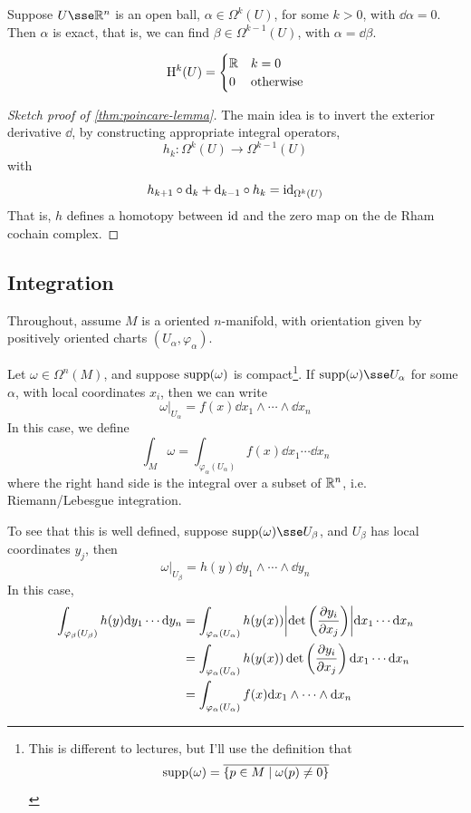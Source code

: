 \documentclass{article}
\begin{document}
\begin{theorem}
    \label{thm:poincare-lemma}
    Suppose \(U \sse \R^n\) is an open ball, \(\alpha \in \Omega^k(U)\), for some \(k > 0\), with \(\dd\alpha = 0\). Then \(\alpha\) is exact, that is, we can find \(\beta \in \Omega^{k-1}(U)\), with \(\alpha = \dd\beta\).
\end{theorem}

\begin{corollary}
    \[\mathrm{H}^k(U) = \begin{cases}
        \mathbb{R} & k = 0 \\
        0 & \text{otherwise}
    \end{cases}\]
\end{corollary}

\begin{proof}
    [Sketch proof of \cref{thm:poincare-lemma}] The main idea is to invert the exterior derivative \(\dd\), by constructing appropriate integral operators,
    \[h_k : \Omega^k(U) \to \Omega^{k-1}(U)\]
    with
    \[h_{k+1} \circ \dd_k + \dd_{k-1} \circ h_k = \operatorname{id}_{\Omega^k(U)}\]
    That is, \(h\) defines a homotopy between \(\operatorname{id}\) and the zero map on the de Rham cochain complex.
\end{proof}

\subsection{Integration}

Throughout, assume \(M\) is a oriented \(n\)-manifold, with orientation given by positively oriented charts \((U_\alpha, \varphi_\alpha)\).

Let \(\omega \in \Omega^n(M)\), and suppose \(\operatorname{supp}(\omega)\) is compact\footnote{This is different to lectures, but I'll use the definition that
\[\operatorname{supp}(\omega) = \overline{\{p \in M \mid \omega(p) \ne 0\}}\]}. If \(\Supp(\omega) \sse U_\alpha\) for some \(\alpha\), with local coordinates \(x_i\), then we can write
\[\omega\vert_{U_\alpha} = f(x)\dd x_1 \wedge \cdots \wedge \dd x_n\]
In this case, we define
\[\int_M \omega = \int_{\varphi_\alpha(U_\alpha)}f(x)\dd x_1 \cdots \dd x_n\]
where the right hand side is the integral over a subset of \(\mathbb{R}^n\), i.e. Riemann/Lebesgue integration.

To see that this is well defined, suppose \(\Supp(\omega) \sse U_\beta\), and \(U_\beta\) has local coordinates \(y_j\), then
\[\omega\vert_{U_\beta} = h(y)\dd y_1 \wedge \cdots \wedge \dd y_n\]
In this case,
\begin{align*}
    \int_{\varphi_\beta(U_\beta)} h(y)\dd y_1\cdots \dd y_n &= \int_{\varphi_\alpha(U_\alpha)}h(y(x))\abs{\det\left(\pdv{y_i}{x_j}\right)}\dd x_1 \cdots \dd x_n \\
    &= \int_{\varphi_\alpha(U_\alpha)}h(y(x))\det\left(\pdv{y_i}{x_j}\right)\dd x_1 \cdots \dd x_n \\
    &= \int_{\varphi_\alpha(U_\alpha)}f(x)\dd x_1 \wedge \cdots \wedge \dd x_n
\end{align*}
\end{document}
